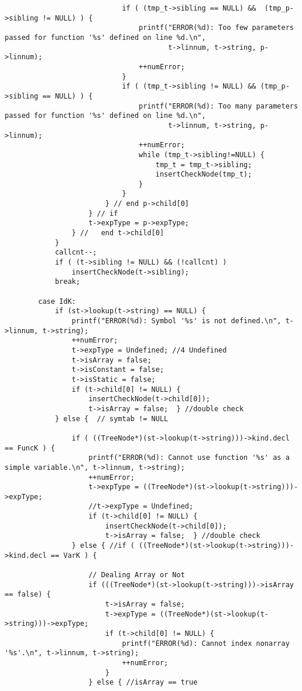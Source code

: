 \documentclass[12pt]{book}
\begin{document}
\begin{lstlisting}
                            if ( (tmp_t->sibling == NULL) &&  (tmp_p->sibling != NULL) ) {
                                printf("ERROR(%d): Too few parameters passed for function '%s' defined on line %d.\n", 
                                       t->linnum, t->string, p->linnum);
                                ++numError;
                            }
                            if ( (tmp_t->sibling != NULL) && (tmp_p->sibling == NULL) ) {
                                printf("ERROR(%d): Too many parameters passed for function '%s' defined on line %d.\n", 
                                       t->linnum, t->string, p->linnum);
                                ++numError;
                                while (tmp_t->sibling!=NULL) {
                                    tmp_t = tmp_t->sibling;
                                    insertCheckNode(tmp_t);
                                }
                            }
                        } // end p->child[0]
                    } // if
                    t->expType = p->expType; 
                } //   end t->child[0] 
            }
            callcnt--;
            if ( (t->sibling != NULL) && (!callcnt) )
                insertCheckNode(t->sibling);
            break;

        case IdK:
            if (st->lookup(t->string) == NULL) { 	   
                printf("ERROR(%d): Symbol '%s' is not defined.\n", t->linnum, t->string);
                ++numError;
                t->expType = Undefined; //4 Undefined
                t->isArray = false;
                t->isConstant = false;
                t->isStatic = false;
                if (t->child[0] != NULL) {
                    insertCheckNode(t->child[0]);
                    t->isArray = false;  } //double check
            } else {  // symtab != NULL

                if ( ((TreeNode*)(st->lookup(t->string)))->kind.decl == FuncK ) {
                    printf("ERROR(%d): Cannot use function '%s' as a simple variable.\n", t->linnum, t->string);
                    ++numError;
                    t->expType = ((TreeNode*)(st->lookup(t->string)))->expType; 
                    //t->expType = Undefined;
                    if (t->child[0] != NULL) {
                        insertCheckNode(t->child[0]);
                        t->isArray = false;  } //double check
                } else { //if ( ((TreeNode*)(st->lookup(t->string)))->kind.decl == VarK ) {

                    // Dealing Array or Not
                    if (((TreeNode*)(st->lookup(t->string)))->isArray == false) {
                        t->isArray = false;
                        t->expType = ((TreeNode*)(st->lookup(t->string)))->expType;
                        if (t->child[0] != NULL) {
                            printf("ERROR(%d): Cannot index nonarray '%s'.\n", t->linnum, t->string);
                            ++numError;
                        } 
                    } else { //isArray == true


\end{lstlisting}
\end{document}
